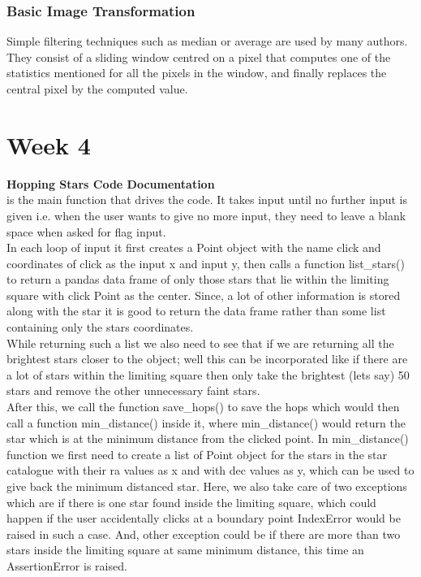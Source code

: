 \documentclass{article}
\begin{document}
\subsubsection{Basic Image Transformation}
Simple filtering techniques such as median or average are used by many authors. They consist of a sliding window centred on a pixel that computes one of the statistics mentioned for all the pixels in the window, and finally replaces the central pixel by the computed value.

\section{Week 4}
\textbf{\large Hopping Stars Code Documentation}\\

{\color{blue}{main()}} is the main function that drives the code. It takes input until no further input is given i.e. when the user wants to give no more input, they need to leave a blank space when asked for flag input.
\\

In each loop of input it first creates a Point object with the name click and coordinates of click as the input x and input y, then calls a function {\color{blue}list\_stars()} to return a pandas data frame of only those stars that lie within the limiting square with click Point as the center.
Since, a lot of other information is stored along with the star it is good to return the data frame rather than some list containing only the stars coordinates.
\\

While returning such a list we also need to see that if we are returning all the brightest stars closer to the object; well this can be incorporated like if there are a lot of stars within the limiting square then only take the brightest (lets say) 50 stars and remove the other unnecessary faint stars.
\\

After this, we call the function {\color{blue}save\_hops()} to save the hops which would then call a function {\color{blue}min\_distance()} inside it, where {\color{blue}min\_distance()} would return the star which is at the minimum distance from the clicked point. In {\color{blue}min\_distance()} function we first need to create a list of Point object for the stars in the star catalogue with their ra values as x and with dec values as y, which can be used to give back the minimum distanced star. Here, we also take care of two exceptions which are if there is one star found inside the limiting square, which could happen if the user accidentally clicks at a boundary point {\color{red}IndexError} would be raised in such a case. And, other exception could be if there are more than two stars inside the limiting square at same minimum distance, this time an {\color{red}AssertionError} is raised. 
\\
\end{document}
